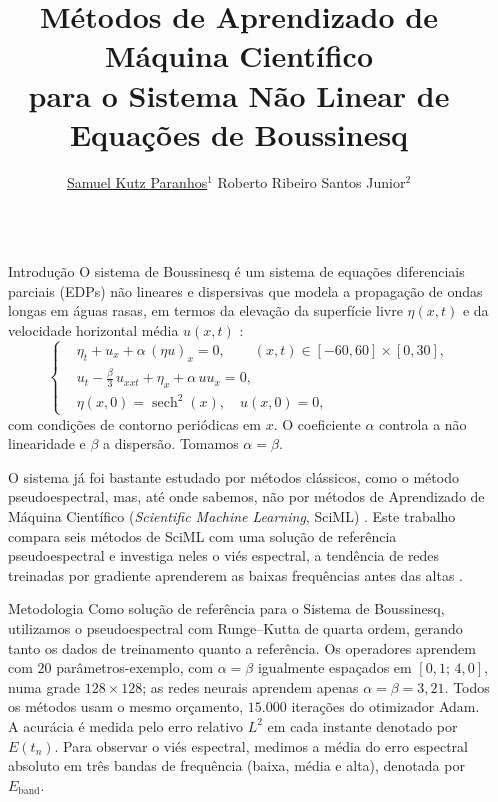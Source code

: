 \documentclass[final]{beamer}
\title{Métodos de Aprendizado de Máquina Científico\\ para o Sistema Não Linear de Equações de Boussinesq}
\author{\underline{Samuel Kutz Paranhos}$^{1}$ \samelineand Roberto Ribeiro Santos Junior$^{2}$}
\institute{%
  $^{1}$Bacharelado em Matemática Industrial, Universidade Federal do Paraná (UFPR), Curitiba, PR\\[0.5ex]
  $^{2}$Departamento de Matemática, Universidade Federal do Paraná (UFPR), Curitiba, PR}
\newlength{\sepwidth}
\newlength{\colwidth}
\newcommand{\separatorcolumn}{\begin{column}{\sepwidth}\end{column}}
\begin{document}
\begin{frame}[t]

\begin{columns}[t]
\separatorcolumn

\begin{column}{\colwidth}

  \begin{block}{Introdução}
    O \textcolor{UniBlue}{sistema de Boussinesq} é um sistema de equações diferenciais parciais (EDPs) não lineares e dispersivas que modela a propagação de ondas longas em águas rasas, em termos da elevação da superfície livre $\eta(x,t)$ e da velocidade horizontal média $u(x,t)$ \cite{martins2023}:
    \begin{equation*}
    \left\{
    \begin{aligned}
        & \eta_t + u_x + \alpha\,(\eta u)_x = 0, \qquad (x,t) \in [-60, 60] \times [0, 30], \\
        & u_t - \tfrac{\beta}{3}\,u_{xxt} + \eta_x + \alpha\,u u_x = 0, \\
        & \eta(x,0) = \operatorname{sech}^2(x), \quad u(x,0) = 0,
    \end{aligned}
    \right.
    \end{equation*}
    com condições de contorno periódicas em $x$. O coeficiente $\alpha$ controla a não linearidade e $\beta$ a dispersão. Tomamos $\alpha = \beta$.

    O sistema já foi bastante estudado por métodos clássicos, como o método pseudoespectral, mas, até onde sabemos, não por métodos de \textcolor{UniBlue}{Aprendizado de Máquina Científico} (\textit{Scientific Machine Learning}, SciML) \cite{karniadakis2021}. Este trabalho compara seis métodos de SciML com uma solução de referência pseudoespectral e investiga neles o \textcolor{UniBlue}{viés espectral}, a tendência de redes treinadas por gradiente aprenderem as baixas frequências antes das altas \cite{rahaman2019}.
  \end{block}

  \begin{block}{Metodologia}
  Como solução de referência para o Sistema de Boussinesq, utilizamos o \textcolor{UniBlue}{pseudoespectral} com Runge--Kutta de quarta ordem, gerando tanto os dados de treinamento quanto a referência. Os operadores aprendem com $20$ parâmetros-exemplo, com \mbox{$\alpha = \beta$} igualmente espaçados em $[0{,}1;\, 4{,}0]$, numa grade $128 \times 128$; as redes neurais aprendem apenas $\alpha = \beta = 3{,}21$. Todos os métodos usam o mesmo orçamento, $15.000$ iterações do otimizador Adam. A acurácia é medida pelo erro relativo $L^2$ em cada instante denotado por $E(t_n)$. Para observar o viés espectral, medimos a média do erro espectral absoluto em três bandas de frequência (baixa, média e alta), denotada por $E_{\text{band}}$.
  \end{block}


\end{column}
\end{columns}
\end{frame}
\end{document}

